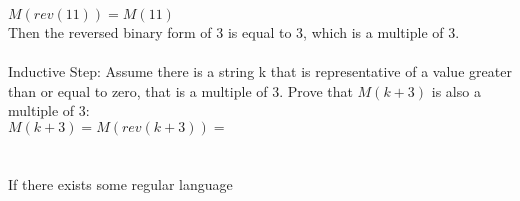 \documentclass[10pt,letterpaper]{article}
\begin{document}
$M(rev(11))=M(11)$\\

Then the reversed binary form of 3 is equal to 3, which is a multiple of 3.\\\\

Inductive Step: Assume there is a string k that is representative of a value
greater than or equal to zero, that is a multiple of 3. Prove
that $M(k+3)$ is also a multiple of 3:\\

$M(k+3)=M(rev(k+3))=$


\section{}
If there exists some regular language
\end{document}
